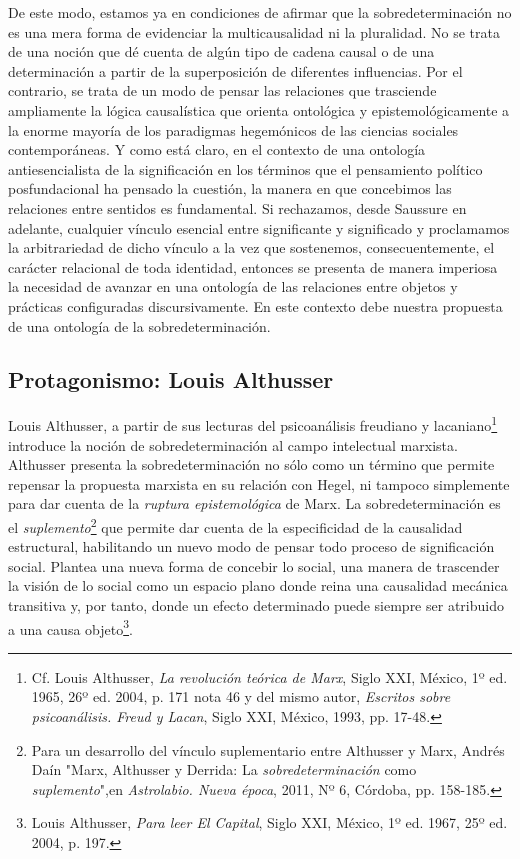 \documentclass{book}
\begin{document}
De este modo, estamos ya en condiciones de afirmar que la
sobredeterminación no es una mera forma de evidenciar la multicausalidad
ni la pluralidad. No se trata de una noción que dé cuenta de algún tipo
de cadena causal o de una determinación a partir de la superposición de
diferentes influencias. Por el contrario, se trata de un modo de pensar
las relaciones que trasciende ampliamente la lógica causalística que
orienta ontológica y epistemológicamente a la enorme mayoría de los
paradigmas hegemónicos de las ciencias sociales contemporáneas. Y como
está claro, en el contexto de una ontología antiesencialista de la
significación en los términos que el pensamiento político posfundacional
ha pensado la cuestión, la manera en que concebimos las relaciones entre
sentidos es fundamental. Si rechazamos, desde Saussure en adelante,
cualquier vínculo esencial entre significante y significado y
proclamamos la arbitrariedad de dicho vínculo a la vez que sostenemos,
consecuentemente, el carácter relacional de toda identidad, entonces se
presenta de manera imperiosa la necesidad de avanzar en una ontología de
las relaciones entre objetos y prácticas configuradas discursivamente.
En este contexto debe nuestra propuesta de una ontología de la
sobredeterminación.

\hypertarget{protagonismo-louis-althusser}{%
\subsection{Protagonismo: Louis Althusser}\label{protagonismo-louis-althusser}}

Louis Althusser, a partir de sus lecturas del psicoanálisis freudiano y
lacaniano\footnote{Cf. Louis Althusser, \emph{La revolución teórica de
  Marx}, Siglo XXI, México, 1º ed. 1965, 26º ed. 2004, p. 171 nota 46 y
  del mismo autor, \emph{Escritos sobre psicoanálisis. Freud y Lacan},
  Siglo XXI, México, 1993, pp. 17-48.} introduce la noción de
sobredeterminación al campo intelectual marxista. Althusser presenta la
sobredeterminación no sólo como un término que permite repensar la
propuesta marxista en su relación con Hegel, ni tampoco simplemente para
dar cuenta de la \emph{ruptura epistemológica} de Marx. La
sobredeterminación es el \emph{suplemento}\footnote{Para un desarrollo
  del vínculo suplementario entre Althusser y Marx, Andrés Daín "Marx,
  Althusser y Derrida: La \emph{sobredeterminación} como
  \emph{suplemento}",en \emph{Astrolabio. Nueva época}, 2011, Nº 6,
  Córdoba, pp. 158-185.} que permite dar cuenta de la especificidad de
la causalidad estructural, habilitando un nuevo modo de pensar todo
proceso de significación social. Plantea una nueva forma de concebir lo
social, una manera de trascender la visión de lo social como un espacio
plano donde reina una causalidad mecánica transitiva y, por tanto, donde
un efecto determinado puede siempre ser atribuido a una causa
objeto\footnote{Louis Althusser, \emph{Para leer El Capital}, Siglo XXI,
  México, 1º ed. 1967, 25º ed. 2004, p. 197.}.
\end{document}
